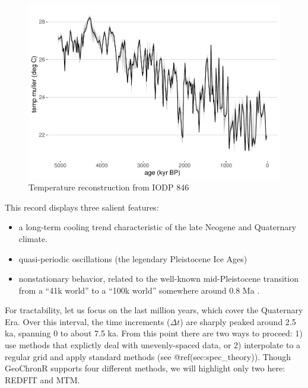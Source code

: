 \documentclass[gchron, manuscript]{copernicus}
\begin{document}
\begin{figure}
\includegraphics[width=12cm]{geoChronR-paper_files/figure-latex/unnamed-chunk-7-1} \caption{Temperature reconstruction from IODP 846}\label{fig:unnamed-chunk-7}
\end{figure}

This record displays three salient features:

\begin{itemize}
\item
  a long-term cooling trend characteristic of the late Neogene and Quaternary climate.
\item
  quasi-periodic oscillations (the legendary Pleistocene Ice Ages)
\item
  nonstationary behavior, related to the well-known mid-Pleistocene transition from a ``41k world'' to a ``100k world'' somewhere around 0.8 Ma \citep{Paillard_2001}.
\end{itemize}

For tractability, let us focus on the last million years, which cover the Quaternary Era. Over this interval, the time increments (\(\Delta t\)) are sharply peaked around 2.5 ka, spanning 0 to about 7.5 ka. From this point there are two ways to proceed: 1) use methods that explictly deal with unevenly-spaced data, or 2) interpolate to a regular grid and apply standard methods (see @ref(sec:spec\_theory)).
Though GeoChronR supports four different methods, we will highlight only two here: REDFIT and MTM.
\end{document}
